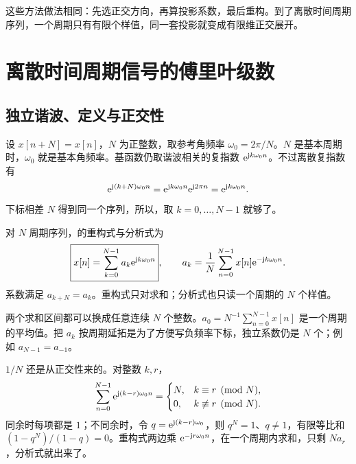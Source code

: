 这些方法做法相同：先选正交方向，再算投影系数，最后重构。到了离散时间周期序列，一个周期只有有限个样值，同一套投影就变成有限维正交展开。

\clearpage
\begingroup
\raggedbottom

\section{离散时间周期信号的傅里叶级数}
\label{sec:discrete-fourier-series}

\subsection{独立谐波、定义与正交性}
\label{subsec:dtfs-analysis-synthesis}

设 $x[n+N]=x[n]$，$N$ 为正整数，取参考角频率 $\omega_0=2\pi/N$。$N$ 是基本周期时，$\omega_0$ 就是基本角频率。基函数仍取谐波相关的复指数 $\mathrm{e}^{\mathrm{j} k\omega_0n}$。不过离散复指数有
\[
  \mathrm{e}^{\mathrm{j}(k+N)\omega_0n}=\mathrm{e}^{\mathrm{j} k\omega_0n}\mathrm{e}^{\mathrm{j}2\pi n}
  =\mathrm{e}^{\mathrm{j} k\omega_0n}.
\]
下标相差 $N$ 得到同一个序列，所以，取 $k=0,\ldots,N-1$ 就够了。

\begin{definition}[离散傅里叶级数]
  对 $N$ 周期序列，的重构式与分析式为
  \begin{equation}
    \boxed{x[n]=\sum_{k=0}^{N-1}a_k\mathrm{e}^{\mathrm{j} k\omega_0n}},
    \qquad
    a_k=\frac1N\sum_{n=0}^{N-1}x[n]\mathrm{e}^{-\mathrm{j} k\omega_0n}.
    \label{eq:dtfs-analysis-synthesis}
  \end{equation}
  系数满足 $a_{k+N}=a_k$。重构式只对求和；分析式也只读一个周期的 $N$ 个样值。
\end{definition}

两个求和区间都可以换成任意连续 $N$ 个整数。$a_0=N^{-1}\sum_{n=0}^{N-1}x[n]$ 是一个周期的平均值。把 $a_k$ 按周期延拓是为了方便写负频率下标，独立系数仍是 $N$ 个；例如 $a_{N-1}=a_{-1}$。

$1/N$ 还是从正交性来的。对整数 $k,r$，
\begin{equation}
  \sum_{n=0}^{N-1}\mathrm{e}^{\mathrm{j}(k-r)\omega_0n}
  =\begin{cases}
    N,&k\equiv r\pmod N,\\
    0,&k\not\equiv r\pmod N.
  \end{cases}
  \label{eq:dtfs-orthogonality}
\end{equation}
同余时每项都是 $1$；不同余时，令 $q=\mathrm{e}^{\mathrm{j}(k-r)\omega_0}$，则 $q^N=1$、$q\ne1$，有限等比和 $(1-q^N)/(1-q)=0$。重构式两边乘 $\mathrm{e}^{-\mathrm{j} r\omega_0n}$，在一个周期内求和，只剩 $Na_r$，分析式就出来了。

